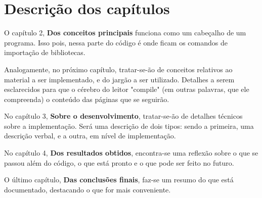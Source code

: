\section{Descrição dos capítulos}
\label{sec:description}

O capítulo 2, \textbf{Dos conceitos principais} funciona como um cabeçalho de um programa. Isso pois, nessa
parte do código é onde ficam os comandos de importação de bibliotecas.

Analogamente, no próximo capítulo, tratar-se-ão de conceitos relativos ao material a ser implementado, e do
jargão a ser utilizado. Detalhes a serem esclarecidos para que o cérebro do leitor "compile" (em outras palavras,
que ele compreenda) o conteúdo das páginas que se seguirão.

No capítulo 3, \textbf{Sobre o desenvolvimento}, tratar-se-ão de detalhes técnicos sobre a implementação. Será uma
descrição de dois tipos: sendo a primeira, uma descrição verbal, e a outra, em nível de implementação.

No capítulo 4, \textbf{Dos resultados obtidos}, encontra-se uma reflexão sobre o que se passou além do código, o que
está pronto e o que pode ser feito no futuro.

O último capítulo, \textbf{Das conclusões finais}, faz-se um resumo do que está documentado, destacando o que for mais
conveniente.
